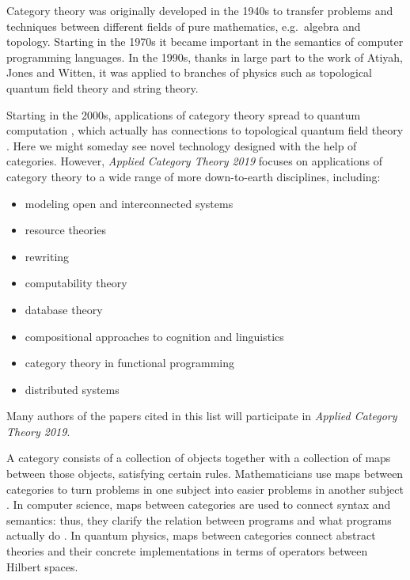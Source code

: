 \documentclass[12pt]{amsart}
\begin{document}
Category theory was originally developed in the 1940s to
transfer problems and techniques between different fields of
pure mathematics, e.g.\ algebra and topology.  Starting in
the 1970s it became important in the semantics of computer
programming languages.  In the 1990s, thanks in large part
to the work of Atiyah, Jones and Witten, it was applied to
branches of physics such as topological quantum field theory
and string theory.

Starting in the 2000s, applications of category theory
spread to quantum computation \cite{abramsky09,selinger},
which actually has connections to topological quantum field
theory \cite{freedman}.  Here we might someday see novel
technology designed with the help of categories.  However,
\textsl{Applied Category Theory 2019} focuses on
applications of category theory to a wide range of more
down-to-earth disciplines, including:

\begin{itemize}
\item modeling open and interconnected systems \cite{baez15,
    baezfongpollard,baezpollard,7sketches}
\item resource theories \cite{jules13, jules17}
\item rewriting \cite{gadd,adhesive} 
\item computability theory \cite{hofstra,hofstra2}
\item database theory \cite{spivak17, johnson}
\item compositional approaches to cognition and linguistics \cite{sadrzadeh,lewis, lewis2}
\item category theory in functional programming \cite{barr, wadler, bart}
\item distributed systems \cite{spivak16,vagner} 
\end{itemize}

\noindent
Many authors of the papers cited in this list will participate in \textsl{Applied Category Theory 2019}.  

A category consists of a collection of objects together with a collection of maps between those objects, satisfying certain rules.  Mathematicians use maps between categories to turn problems in one subject into easier problems in another subject \cite{riehl}.  In computer science, maps between categories are used to connect syntax and semantics: thus, they clarify the relation between programs and what programs actually do \cite{crole,pierce}.  In quantum physics, maps between categories connect abstract theories and their concrete implementations in terms of operators between Hilbert spaces.
\end{document}
